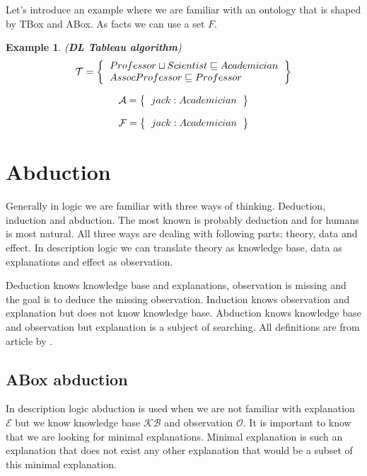 \documentclass[12pt,a4paper]{article}
\newtheorem{example}{Example}[subsection]
\begin{document}
Let's introduce an example where we are familiar with an ontology that is shaped by TBox and ABox. As facts we can use a set $F$. 

\begin{example}{(\textbf{DL Tableau algorithm})}
	\[ 
	\mathcal{T} = \left\{
	\begin{tabular}{l c}
	$Professor \sqcup Scientist \sqsubseteq Academician$ \\
	$AssocProfessor \sqsubseteq Professor$ \\
	\end{tabular}
	\right \}
	\]
	
	\[ 
	\mathcal{A} = \left\{
	\begin{tabular}{l c}
	$jack : Academician$
	\end{tabular}
	\right \}
	\]	
	
	\[ 
	\mathcal{F} = \left\{
	\begin{tabular}{l c}
	$jack : Academician$
	\end{tabular}
	\right \}
	\]											
\end{example}

\section{Abduction}
Generally in logic we are familiar with three ways of thinking. Deduction, induction and abduction. The most known is probably deduction and for humans is most natural. All three ways are dealing with following parts: theory, data and effect. In description logic we can translate theory as knowledge base, data as explanations and  effect as observation.

Deduction knows knowledge base and explanations, observation is missing and the goal is to deduce the missing observation. Induction knows observation and explanation but does not know knowledge base. Abduction knows knowledge base and observation but explanation is a subject of searching. All definitions are from article by \citep{pukancovaAboxAbduction}.

\subsection{ABox abduction}
In description logic abduction is used when we are not familiar with explanation $\mathcal{E}$ but we know knowledge base $\mathcal{KB}$ and observation $\mathcal{O}$. It is important to know that we are looking for minimal explanations. Minimal explanation is such an explanation that does not exist any other explanation that would be a subset of this minimal explanation.
\end{document}
